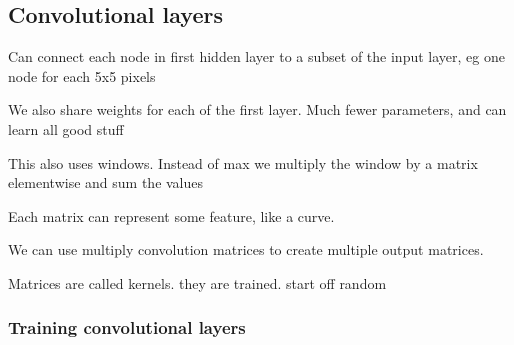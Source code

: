 
\subsection{Convolutional layers}

Can connect each  node in first hidden layer to a subset of the input layer, eg one node for each 5x5 pixels

We also share weights for each of the first layer. Much fewer parameters, and can learn all good stuff

This also uses windows. Instead of max we multiply the window by a matrix elementwise and sum the values

Each matrix can represent some feature, like a curve.

We can use multiply convolution matrices to create multiple output matrices.

Matrices are called kernels. they are trained. start off random

\subsubsection{Training convolutional layers}


